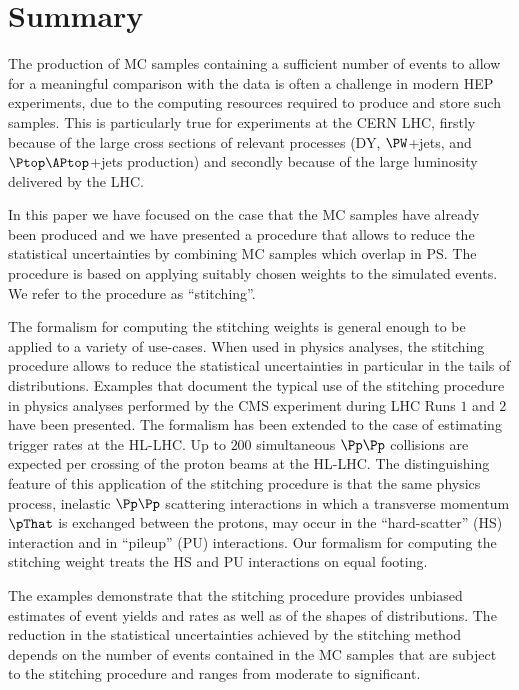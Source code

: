 \section{Summary}
\label{sec:summary}

The production of MC samples containing a sufficient number of events to allow for a meaningful comparison with the data is often a challenge in modern HEP experiments,
due to the computing resources required to produce and store such samples.
This is particularly true for experiments at the CERN LHC,
firstly because of the large cross sections of relevant processes (\eg DY, $\PW$+jets, and $\Ptop\APtop$+jets production)
and secondly because of the large luminosity delivered by the LHC.

In this paper we have focused on the case that the MC samples have already been produced
and we have presented a procedure that allows to reduce the statistical uncertainties 
by combining MC samples which overlap in PS.
The procedure is based on applying suitably chosen weights to the simulated events.
We refer to the procedure as ``stitching''.

The formalism for computing the stitching weights is general enough to be applied to a variety of use-cases.
When used in physics analyses, the stitching procedure allows to reduce the statistical uncertainties in particular in the tails of distributions.
Examples that document the typical use of the stitching procedure in physics analyses performed by the CMS experiment during LHC Runs $1$ and $2$ have been presented.
The formalism has been extended to the case of estimating trigger rates at the HL-LHC.
Up to  $200$ simultaneous $\Pp\Pp$ collisions are expected per crossing of the proton beams at the HL-LHC.
The distinguishing feature of this application of the stitching procedure is that the same physics process, 
inelastic $\Pp\Pp$ scattering interactions in which a transverse momentum $\pThat$ is exchanged between the protons,
may occur in the ``hard-scatter'' (HS) interaction and in ``pileup'' (PU) interactions.
Our formalism for computing the stitching weight treats the HS and PU interactions on equal footing.

The examples demonstrate that the stitching procedure provides unbiased estimates of event yields and rates as well as of the shapes of distributions.
The reduction in the statistical uncertainties achieved by the stitching method depends on the number of events contained in the MC samples that are subject to the stitching procedure
and ranges from moderate to significant.
